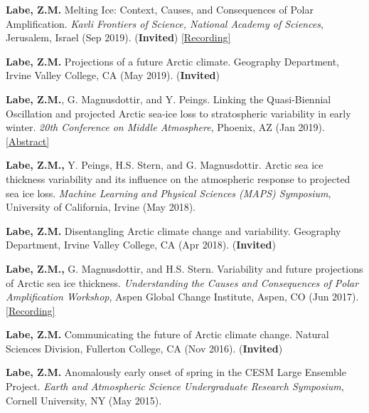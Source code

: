 \documentclass[margin,line,palatino,courier,10pt]{res}
\begin{document}
\begin{resume}
\begin{etaremune}[leftmargin=0in,topsep=0in,parsep=0in]
\item \textbf{Labe, Z.M.} Melting Ice: Context, Causes, and Consequences of Polar Amplification. \textit{Kavli Frontiers of Science, National Academy of Sciences}, Jerusalem, Israel (Sep 2019). (\textbf{Invited}) \href{https://vimeo.com/362912204}{[Recording]}
\item \textbf{Labe, Z.M.} Projections of a future Arctic climate. Geography Department, Irvine Valley College, CA (May 2019). (\textbf{Invited})
\item \textbf{Labe, Z.M.}, G. Magnusdottir, and Y. Peings. Linking the Quasi-Biennial Oscillation and projected Arctic sea-ice loss to stratospheric variability in early winter. \textit{20th Conference on Middle Atmosphere}, Phoenix, AZ (Jan 2019). \href{https://ams.confex.com/ams/2019Annual/meetingapp.cgi/Paper/352664}{[Abstract]}
\item \textbf{Labe, Z.M.,} Y. Peings, H.S. Stern, and G. Magnusdottir. Arctic sea ice thickness variability and its influence on the atmospheric response to projected sea ice loss. \textit{Machine Learning and Physical Sciences (MAPS) Symposium}, University of California, Irvine (May 2018). 
\item \textbf{Labe, Z.M.} Disentangling Arctic climate change and variability. Geography Department, Irvine Valley College, CA (Apr 2018). (\textbf{Invited})
\item \textbf{Labe, Z.M.,} G. Magnusdottir, and H.S. Stern. Variability and future projections of Arctic sea ice thickness. \textit{Understanding the Causes and Consequences of Polar Amplification Workshop}, Aspen Global Change Institute, Aspen, CO (Jun 2017). \href{https://www.agci.org/lib/17s1/variability-and-future-projections-arctic-sea-ice-thickness}{[Recording]}
\item \textbf{Labe, Z.M.} Communicating the future of Arctic climate change. Natural Sciences Division, Fullerton College, CA (Nov 2016). (\textbf{Invited})
\item \textbf{Labe, Z.M.} Anomalously early onset of spring in the CESM Large Ensemble Project. \textit{Earth and Atmospheric Science Undergraduate Research Symposium}, Cornell University, NY (May 2015). 

\end{etaremune}


\end{resume}
\end{document}

